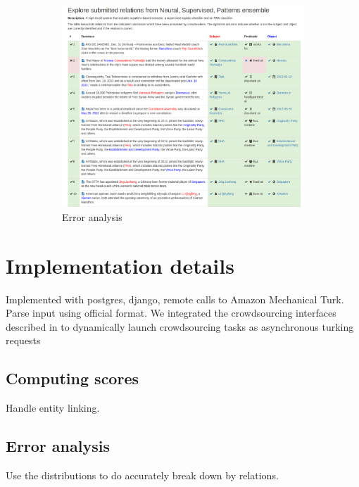 \begin{figure}
  \begin{subfigure}{0.8\textwidth}
    \includegraphics[width=\textwidth]{figures/interface/errors}
    \caption{Error analysis}
  \end{subfigure}

  \caption[KBP Online]{\label{fig:kbpo:kbpo}
  }
\end{figure}

\section{Implementation details}
Implemented with postgres, django, remote calls to Amazon Mechanical Turk.
Parse input using official format.
We integrated the crowdsourcing interfaces described in  to dynamically launch crowdsourcing tasks as 
asynchronous turking requests

\subsection{Computing scores}
Handle entity linking.

\subsection{Error analysis}
Use the distributions to do accurately break down by relations.

